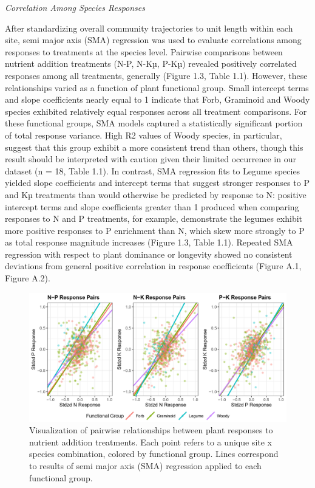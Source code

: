\documentclass[twoside,12pt,final]{ucthesis-CA2012}
\begin{document}
\begin{ucmainmatter}
\emph{Correlation Among Species Responses}

After standardizing overall community trajectories to unit length within each site, semi major axis (SMA) regression was used to evaluate correlations among responses to treatments at the species level. Pairwise comparisons between nutrient addition treatments (N-P, N-Kµ, P-Kµ) revealed positively correlated responses among all treatments, generally (Figure 1.3, Table 1.1). However, these relationships varied as a function of plant functional group. Small intercept terms and slope coefficients nearly equal to 1 indicate that Forb, Graminoid and Woody species exhibited relatively equal responses across all treatment comparisons. For these functional groups, SMA models captured a statistically significant portion of total response variance. High R2 values of Woody species, in particular, suggest that this group exhibit a more consistent trend than others, though this result should be interpreted with caution given their limited occurrence in our dataset (n = 18, Table 1.1).
In contrast, SMA regression fits to Legume species yielded slope coefficients and intercept terms that suggest stronger responses to P and Kµ treatments than would otherwise be predicted by response to N: positive intercept terms and slope coefficients greater than 1 produced when comparing responses to N and P treatments, for example, demonstrate the legumes exhibit more positive responses to P enrichment than N, which skew more strongly to P as total response magnitude increases (Figure 1.3, Table 1.1).
Repeated SMA regression with respect to plant dominance or longevity showed no consistent deviations from general positive correlation in response coefficients (Figure A.1, Figure A.2).
\begin{figure}
\centering
\includegraphics[width=\textwidth,height=0.35\textheight]{figure/Fig1_3.png}
\caption{Visualization of pairwise relationships between plant responses to nutrient addition treatments. Each point refers to a unique site x species combination, colored by functional group. Lines correspond to results of semi major axis (SMA) regression applied to each functional group. \label{fig-1-3}}

\end{figure}
\end{ucmainmatter}
\end{document}
